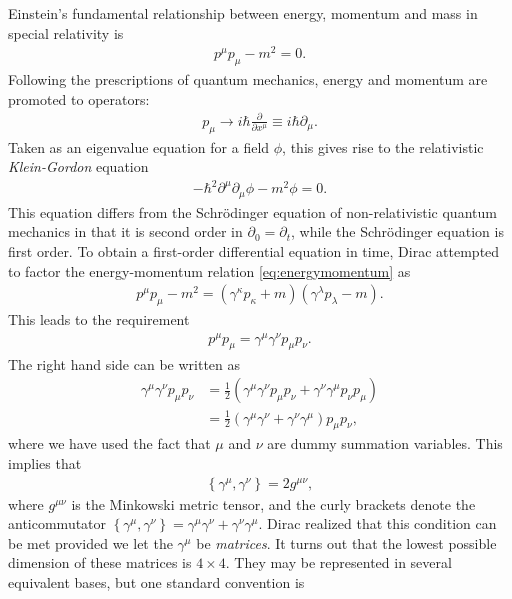 \documentclass[twoside,english]{uiofysmaster}
\begin{document}
Einstein's fundamental relationship between energy, momentum and mass in special relativity is
\begin{align}
  p^\mu p_\mu - m^2 = 0.\label{eq:energymomentum}
\end{align}
Following the prescriptions of quantum mechanics, energy and momentum are promoted to operators:
\begin{align}
	p_\mu \to i\hbar \frac{\partial}{\partial x^\mu} \equiv i\hbar \partial_\mu.
\end{align}
Taken as an eigenvalue equation for a field $\phi$, this gives rise to the relativistic {\it Klein-Gordon} equation
\begin{align}
	-\hbar^2 \partial^\mu \partial_\mu \phi - m^2 \phi = 0.
\end{align}
This equation differs from the Schr\"{o}dinger equation of non-relativistic quantum mechanics in that it is second order in $\partial_{0} = \partial_t$, while the Schr\"{o}dinger equation is first order. To obtain a first-order differential equation in time, Dirac attempted \cite{griffiths:elementary_particles} to factor the energy-momentum relation \eqref{eq:energymomentum} as
\begin{align}
	p^\mu p_\mu - m^2 = \left(\gamma^\kappa p_\kappa + m\right)\left(\gamma^\lambda p_\lambda - m\right).
\end{align}
This leads to the requirement
\begin{align}
	p^\mu p_\mu = \gamma^\mu \gamma^\nu p_\mu p_\nu.
\end{align}
The right hand side can be written as
\begin{align}
	\gamma^\mu \gamma^\nu p_\mu p_\nu &= \frac{1}{2}\left( \gamma^\mu \gamma^\nu p_\mu p_\nu + \gamma^\nu \gamma^\mu p_\nu p_\mu \right)\\
	&= \frac{1}{2}\left( \gamma^\mu \gamma^\nu  + \gamma^\nu \gamma^\mu \right) p_\mu p_\nu,
\end{align}
where we have used the fact that $\mu$ and $\nu$ are dummy summation variables. This implies that
\begin{align}
	\left\{ \gamma^\mu, \gamma^\nu \right\} = 2g^{\mu\nu},
\end{align}
where $g^{\mu\nu}$ is the Minkowski metric tensor, and the curly brackets denote the anticommutator $\left\{ \gamma^\mu, \gamma^\nu \right\} = \gamma^\mu \gamma^\nu + \gamma^\nu \gamma^\mu$. Dirac realized that this condition can be met provided we let the $\gamma^\mu$ be {\it matrices}. It turns out that the lowest possible dimension of these matrices is $4\times 4$. They may be represented in several equivalent bases, but one standard convention is
\end{document}
